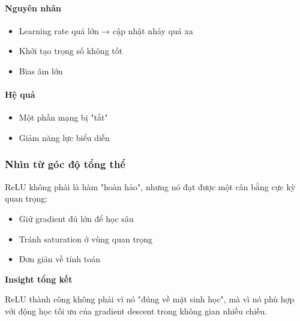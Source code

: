 \paragraph{Nguyên nhân}

\begin{itemize}
	\item Learning rate quá lớn → cập nhật nhảy quá xa
	\item Khởi tạo trọng số không tốt
	\item Bias âm lớn
\end{itemize}

\paragraph{Hệ quả}

\begin{itemize}
	\item Một phần mạng bị "tắt"
	\item Giảm năng lực biểu diễn
\end{itemize}

\subsubsection*{Nhìn từ góc độ tổng thể}

ReLU không phải là hàm "hoàn hảo", nhưng nó đạt được một cân bằng cực kỳ quan trọng:

\begin{itemize}
	\item Giữ gradient đủ lớn để học sâu
	\item Tránh saturation ở vùng quan trọng
	\item Đơn giản về tính toán
\end{itemize}

\begin{mdframed}[style=infobox]
	\textbf{Insight tổng kết}
	
	ReLU thành công không phải vì nó "đúng về mặt sinh học", mà vì nó phù hợp với động học tối ưu của gradient descent trong không gian nhiều chiều.
\end{mdframed}

